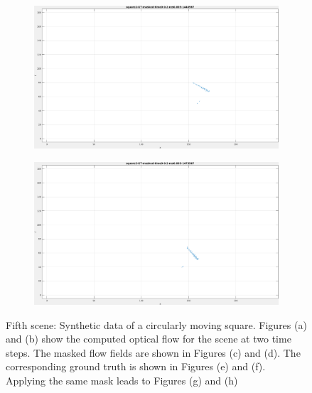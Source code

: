 \begin{figure}[tb]
\begin{subfigure}{.45\textwidth}
  \caption{}
\end{subfigure}
\begin{subfigure}{.45\textwidth}
  \centering
  \includegraphics[height=.6\linewidth]{figs/square2/square2-GT-masked-1.png}
  \caption{}
\end{subfigure}
\begin{subfigure}{.45\textwidth}
  \centering
  \includegraphics[height=.6\linewidth]{figs/square2/square2-GT-masked-2.png}
  \caption{}
\end{subfigure}
\caption[Fifth scene: Synthetic data of a circularly moving square.]{Fifth scene: Synthetic data of a circularly moving square.
Figures (a) and (b) show the computed optical flow for the scene at two time steps. The masked flow fields are shown in Figures (c) and (d).
The corresponding ground truth is shown in Figures (e) and (f). Applying the same mask leads to Figures (g) and (h)}
\label{fig:square2-snapshots}
\end{figure}


